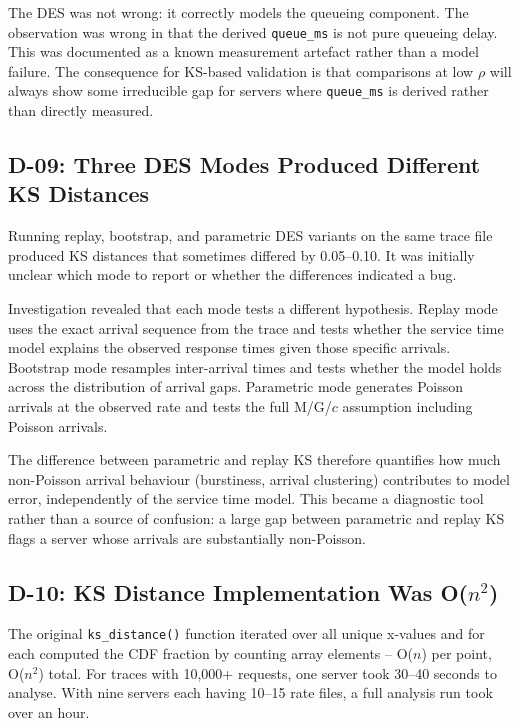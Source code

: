 The DES was not wrong: it correctly models the queueing component. The observation was wrong in that the derived \texttt{queue\_ms} is not pure queueing delay. This was documented as a known measurement artefact rather than a model failure. The consequence for KS-based validation is that comparisons at low $\rho$ will always show some irreducible gap for servers where \texttt{queue\_ms} is derived rather than directly measured.

\subsection{D-09: Three DES Modes Produced Different KS Distances}

Running replay, bootstrap, and parametric DES variants on the same trace file produced KS distances that sometimes differed by 0.05--0.10. It was initially unclear which mode to report or whether the differences indicated a bug.

Investigation revealed that each mode tests a different hypothesis. Replay mode uses the exact arrival sequence from the trace and tests whether the service time model explains the observed response times given those specific arrivals. Bootstrap mode resamples inter-arrival times and tests whether the model holds across the distribution of arrival gaps. Parametric mode generates Poisson arrivals at the observed rate and tests the full M/G/$c$ assumption including Poisson arrivals.

The difference between parametric and replay KS therefore quantifies how much non-Poisson arrival behaviour (burstiness, arrival clustering) contributes to model error, independently of the service time model. This became a diagnostic tool rather than a source of confusion: a large gap between parametric and replay KS flags a server whose arrivals are substantially non-Poisson.

\subsection{D-10: KS Distance Implementation Was O($n^2$)}

The original \texttt{ks\_distance()} function iterated over all unique x-values and for each computed the CDF fraction by counting array elements -- O($n$) per point, O($n^2$) total. For traces with 10{,}000+ requests, one server took 30--40 seconds to analyse. With nine servers each having 10--15 rate files, a full analysis run took over an hour.

